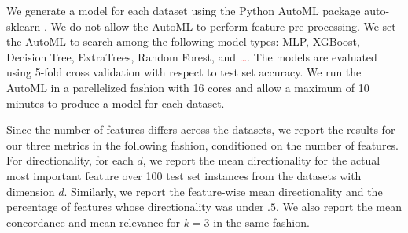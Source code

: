 \documentclass[mnsc,blindrev]{informs3}
\begin{document}
        We generate a model for each dataset using the Python AutoML package auto-sklearn \citep{feurer-neurips15a}. We do not allow the AutoML to perform feature pre-processing. We set the AutoML to search among the following model types: MLP, XGBoost, Decision Tree, ExtraTrees, Random Forest, and \textcolor{red}{\ldots}. The models are evaluated using 5-fold cross validation with respect to test set accuracy. We run the AutoML in a parellelized fashion with 16 cores and allow a maximum of 10 minutes to produce a model for each dataset. 

        Since the number of features differs across the datasets, we report the results for our three metrics in the following fashion, conditioned on the number of features. For directionality, for each $d$, we report the mean directionality for the actual most important feature over 100 test set instances from the datasets with dimension $d$. Similarly, we report the feature-wise mean directionality and the percentage of features whose directionality was under $.5$. We also report the mean concordance and mean relevance for $k=3$ in the same fashion.

\end{document}
